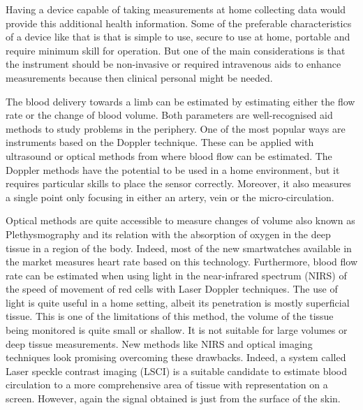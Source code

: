 Having a device capable of taking measurements at home collecting data would provide this additional health information. Some of the preferable characteristics of a device like that is that is simple to use, secure to use at home, portable and require minimum skill for operation. But one of the main considerations is that the instrument should be non-invasive or required intravenous aids to enhance measurements because then clinical personal might be needed.  

The blood delivery towards a limb can be estimated by estimating either the flow rate or the change of blood volume. Both parameters are well-recognised aid methods to study problems in the periphery. One of the most popular ways are instruments based on the Doppler technique. These can be applied with ultrasound or optical methods from where blood flow can be estimated. The Doppler methods have the potential to be used in a home environment, but it requires particular skills to place the sensor correctly. Moreover, it also measures a single point only focusing in either an artery, vein or the micro-circulation. 

Optical methods are quite accessible to measure changes of volume also known as Plethysmography and its relation with the absorption of oxygen in the deep tissue in a region of the body. Indeed, most of the new smartwatches available in the market measures heart rate based on this technology. Furthermore, blood flow rate can be estimated when using light in the near-infrared spectrum (NIRS) of the speed of movement of red cells with Laser Doppler techniques. The use of light is quite useful in a home setting, albeit its penetration is mostly superficial tissue. This is one of the limitations of this method, the volume of the tissue being monitored is quite small or shallow. It is not suitable for large volumes or deep tissue measurements. New methods like NIRS and optical imaging techniques look promising overcoming these drawbacks. Indeed, a system called Laser speckle contrast imaging (LSCI) is a suitable candidate to estimate blood circulation to a more comprehensive area of tissue with representation on a screen. However, again the signal obtained is just from the surface of the skin. 

